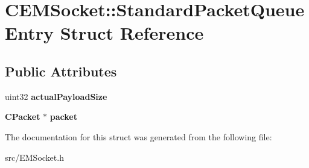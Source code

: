 \section{CEMSocket::StandardPacketQueueEntry Struct Reference}
\label{structCEMSocket_1_1StandardPacketQueueEntry}
\subsection*{Public Attributes}
\begin{DoxyCompactItemize}
\item 
uint32 {\bfseries actualPayloadSize}\label{structCEMSocket_1_1StandardPacketQueueEntry_a137a468d6b320352cdd37440f2597985}

\item 
{\bf CPacket} $\ast$ {\bfseries packet}\label{structCEMSocket_1_1StandardPacketQueueEntry_a67a93a32a285f19192031848b0ae0c3e}

\end{DoxyCompactItemize}


The documentation for this struct was generated from the following file:\begin{DoxyCompactItemize}
\item 
src/EMSocket.h\end{DoxyCompactItemize}
